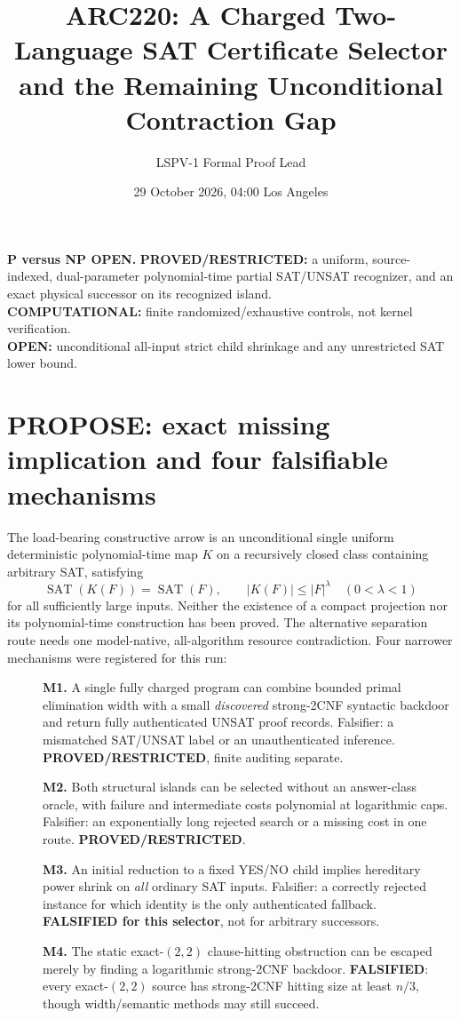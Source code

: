 \documentclass[11pt]{article}
\title{ARC220: A Charged Two-Language SAT Certificate Selector\\and the Remaining Unconditional Contraction Gap}
\author{LSPV-1 Formal Proof Lead}
\date{29 October 2026, 04:00 Los Angeles}
\begin{document}
\maketitle
\begin{center}
\textbf{P versus NP OPEN.}\quad
\textbf{PROVED/RESTRICTED:} a uniform, source-indexed, dual-parameter polynomial-time partial SAT/UNSAT recognizer, and an exact physical successor on its recognized island.\\
\textbf{COMPUTATIONAL:} finite randomized/exhaustive controls, not kernel verification.\\
\textbf{OPEN:} unconditional all-input strict child shrinkage and any unrestricted SAT lower bound.
\end{center}

\section{PROPOSE: exact missing implication and four falsifiable mechanisms}
The load-bearing constructive arrow is an unconditional single uniform deterministic polynomial-time map $K$ on a recursively closed class containing arbitrary SAT, satisfying
\[\operatorname{SAT}(K(F))=\operatorname{SAT}(F),\qquad |K(F)|\le |F|^\lambda\quad(0<\lambda<1)\]
for all sufficiently large inputs. Neither the existence of a compact projection nor its polynomial-time construction has been proved. The alternative separation route needs one model-native, all-algorithm resource contradiction. Four narrower mechanisms were registered for this run:
\begin{description}
\item[] \textbf{M1.} A single fully charged program can combine bounded primal elimination width with a small \emph{discovered} strong-2CNF syntactic backdoor and return fully authenticated UNSAT proof records. Falsifier: a mismatched SAT/UNSAT label or an unauthenticated inference. \textbf{PROVED/RESTRICTED}, finite auditing separate.
\item[] \textbf{M2.} Both structural islands can be selected without an answer-class oracle, with failure and intermediate costs polynomial at logarithmic caps. Falsifier: an exponentially long rejected search or a missing cost in one route. \textbf{PROVED/RESTRICTED}.
\item[] \textbf{M3.} An initial reduction to a fixed YES/NO child implies hereditary power shrink on \emph{all} ordinary SAT inputs. Falsifier: a correctly rejected instance for which identity is the only authenticated fallback. \textbf{FALSIFIED for this selector}, not for arbitrary successors.
\item[] \textbf{M4.} The static exact-$(2,2)$ clause-hitting obstruction can be escaped merely by finding a logarithmic strong-2CNF backdoor. \textbf{FALSIFIED}: every exact-$(2,2)$ source has strong-2CNF hitting size at least $n/3$, though width/semantic methods may still succeed.
\end{description}
\end{document}
